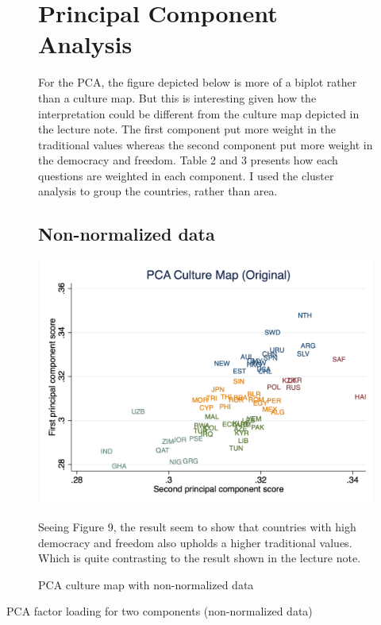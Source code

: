 \documentclass[10pt,leqno]{article}
\begin{document}
\pagebreak
\begin{figure}  [h!]
\section{Principal Component Analysis}
For the PCA, the figure depicted below is more of a biplot rather than a culture map. But this is interesting given how the interpretation could be different from the culture map depicted in the lecture note. The first component put more weight in the traditional values whereas the second component put more weight in the democracy and freedom. Table 2 and 3 presents how each questions are weighted in each component. I used the cluster analysis to group the countries, rather than area.
\\
\subsection{Non-normalized data}
\begin{center}
\caption{PCA culture map with non-normalized data}
\includegraphics[scale=0.25]{PCA_CultureMap_ORI.png}
\end{center}
Seeing Figure 9, the result seem to show that countries with high democracy and freedom also upholds a higher traditional values. Which is quite contrasting to the result shown in the lecture note. 
\end{figure} 

\begin{table}[tbp]
\centering
\caption{PCA factor loading for two components (non-normalized data)}
\begin{adjustbox}{width=0.7\textwidth}
\small

\end{adjustbox}
\end{table}
\end{document}
